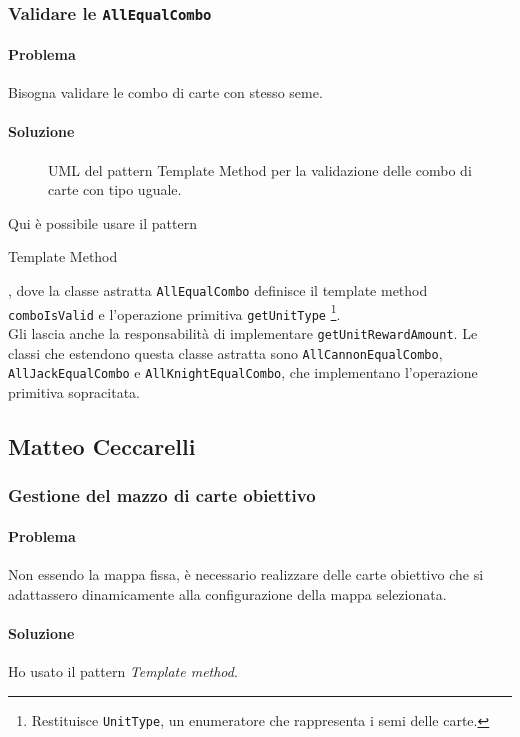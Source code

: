 \documentclass[a4paper,12pt]{report}
\begin{document}
\subsubsection{Validare le \texttt{AllEqualCombo}}
\paragraph{Problema}
Bisogna validare le combo di carte con stesso seme.
\paragraph{Soluzione}
\begin{figure}[H]
	\centering
	
	\caption{UML del pattern Template Method per la validazione delle combo di carte con tipo uguale.}
\end{figure}
Qui è possibile usare il pattern \begin{itshape}Template Method\end{itshape}, dove la classe astratta \texttt{AllEqualCombo} definisce il template method \texttt{comboIsValid} e l'operazione primitiva \texttt{getUnitType} \footnote{Restituisce \texttt{UnitType}, un enumeratore che rappresenta i semi delle carte.}.
\\
Gli lascia anche la responsabilità di implementare \texttt{getUnitRewardAmount}. Le classi che estendono questa classe astratta sono \texttt{AllCannonEqualCombo}, \texttt{AllJackEqualCombo} e \texttt{AllKnightEqualCombo}, che implementano l'operazione primitiva sopracitata.

\subsection{Matteo Ceccarelli}
\subsubsection{Gestione del mazzo di carte obiettivo}
\paragraph{Problema}
Non essendo la mappa fissa, è necessario realizzare delle carte obiettivo che si adattassero dinamicamente alla configurazione della mappa selezionata.
\paragraph{Soluzione}
Ho usato il pattern \textit{Template method}.
\end{document}

